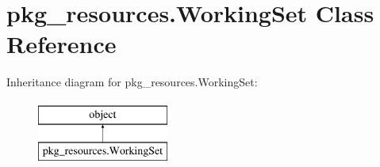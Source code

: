 \hypertarget{classpkg__resources_1_1WorkingSet}{}\section{pkg\+\_\+resources.\+Working\+Set Class Reference}
\label{classpkg__resources_1_1WorkingSet}
Inheritance diagram for pkg\+\_\+resources.\+Working\+Set\+:\begin{figure}[H]
\begin{center}
\leavevmode
\includegraphics[height=2.000000cm]{classpkg__resources_1_1WorkingSet}
\end{center}
\end{figure}
